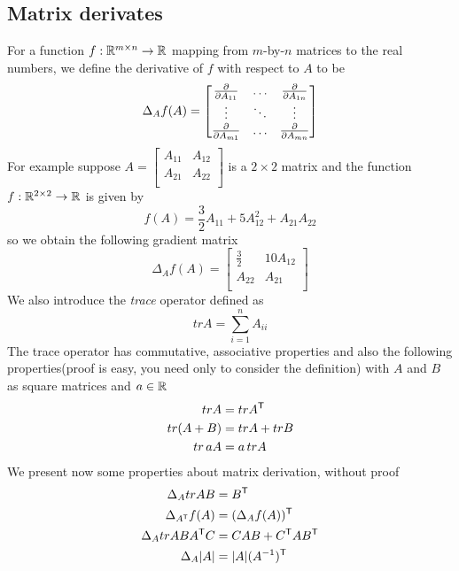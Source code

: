 \subsection{Matrix derivates}
For a function $f: \mathbb{R} ^{m \times n} \to \mathbb{R}$ mapping from $m$-by-$n$ matrices to the real numbers, 
we define the derivative of $f$ with respect to $A$ to be 
\[ \Delta _A f(A) = \begin{bmatrix}
                        \frac{\partial}{\partial A_{11}} & \ldots & \frac{\partial}{\partial A_{1n}} \\
                        \vdots & \ddots & \vdots \\
                        \frac{\partial}{\partial A_{m1}} & \ldots & \frac{\partial}{\partial A_{mn}} \\
                    \end{bmatrix} \]
For example suppose $A = \begin{bmatrix}
                       A_{11} & A_{12} \\
                       A_{21} & A_{22} \\
                         \end{bmatrix}$
is a $2 \times 2$ matrix and the function $f:\mathbb{R} ^{2 \times 2} \to \mathbb{R}$ is given by 
\[ f(A) = \frac{3}{2} A_{11} + 5A^2 _{12} + A_{21}A_{22} \]
so we obtain the following gradient matrix 
\[ \Delta _A f(A) = \begin{bmatrix}
                    \frac{3}{2} & 10 A_{12} \\
                    A_{22} & A_{21} \\
                    \end{bmatrix} \]
We also introduce the \emph{trace} operator defined as 
\[ tr A = \sum _{i=1}^n A_{ii} \]
The trace operator has commutative, associative properties and also the following properties(proof is 
easy, you need only to consider the definition) with $A$ and $B$ as square matrices and $a \in \mathbb{R}$
\begin{align*}
    tr A & = tr A ^ \mathsf{T} \\
    tr (A + B) & = tr A + tr B \\
    tr \, aA & = a \, tr A \\
\end{align*}
We present now some properties about matrix derivation, without proof
\begin{align}
    \Delta _A tr AB & = B ^ \mathsf{T} \\
    \Delta _{A ^ \mathsf{T}} f(A) & = (\Delta _A f(A)) ^ \mathsf{T} \\
    \Delta _A tr AB A ^ \mathsf{T} C & = CAB + C ^ \mathsf{T} A B ^ \mathsf{T} \\
    \Delta _A |A| & = |A| (A ^{-1}) ^ \mathsf{T} \\
\end{align}

